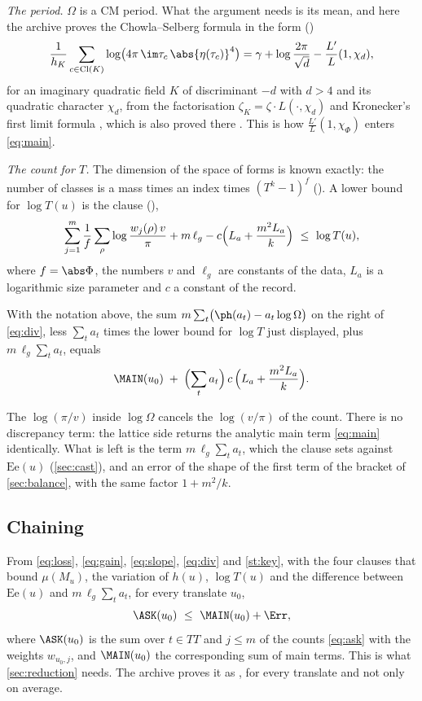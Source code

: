 \emph{The period.} $\Omega$ is a CM period. What the argument needs is its mean, and here the
archive proves the Chowla--Selberg formula
\cite{chowla1949epstein,selbergchowla1967} in the form \lvS{} ()
\begin{equation}\label{eq:cs}
\frac1{h_K}\sum_{c\in\mathrm{Cl}(K)}\log\bigl(4\pi\,\im\tau_c\,\abs{\eta(\tau_c)}^4\bigr)
=\gamma+\log\frac{2\pi}{\sqrt d}-\frac{L'}{L}(1,\chi_d),
\end{equation}
for an imaginary quadratic field $K$ of discriminant $-d$ with $d>4$ and its quadratic character
$\chi_d$, from the factorisation $\zeta_K=\zeta\cdot L(\cdot,\chi_d)$ and
Kronecker's first limit formula \cite{siegel1980advanced}, which is also proved there \lvS. This is how
$\tfrac{L'}{L}(1,\chi_\Phi)$ enters \eqref{eq:main}.

\emph{The count for $T$.} The dimension of the space of forms is known exactly: the number of
classes is a mass times an index times $(T^k-1)^f$ \lvS{} (\textsubscript{}). A
lower bound for $\log T(u)$ is the clause \lvS{}
(),
\[
\sum_{j=1}^m\frac1f\sum_{\rho}\log\frac{w_j(\rho)\,v}{\pi}+m\,\ell_g-c\Bigl(L_a+\frac{m^2L_a}{k}\Bigr)\ \le\ \log T(u),
\]
where $f=\abs\Phi$, the numbers $v$ and $\ell_g$ are constants of the data, $L_a$ is a
logarithmic size parameter and $c$ a constant of the record.

\begin{statement}\label{st:key}
With the notation above, the sum $m\sum_t\bigl(\ph(a_t)-a_t\log\Omega\bigr)$ on the right of
\eqref{eq:div}, less $\sum_ta_t$ times the lower bound for $\log T$ just displayed, plus
$m\,\ell_g\sum_ta_t$, equals
\[
\MAIN(u_0)\;+\;\Bigl(\sum_ta_t\Bigr)\,c\,\Bigl(L_a+\frac{m^2L_a}{k}\Bigr).
\]
\end{statement}
The $\log(\pi/v)$ inside $\log\Omega$ cancels the $\log(v/\pi)$ of the count. There is no
discrepancy term: the lattice side returns the analytic main term \eqref{eq:main} identically.
What is left is the term $m\,\ell_g\sum_ta_t$, which the clause  sets against
$\mathrm{Ee}(u)$ (\cref{sec:cast}), and an error of the shape of the first term of the bracket
of \cref{sec:balance}, with the same factor $1+m^2/k$.

\subsection{Chaining}
From \eqref{eq:loss}, \eqref{eq:gain}, \eqref{eq:slope}, \eqref{eq:div} and \cref{st:key},
with the four clauses that bound $\mu(M_u)$, the variation of $h(u)$, $\log T(u)$ and the
difference between $\mathrm{Ee}(u)$ and $m\,\ell_g\sum_ta_t$, for every translate $u_0$,
\[
\ASK(u_0)\ \le\ \MAIN(u_0)+\Err ,
\]
where $\ASK(u_0)$ is the sum over $t\in TT$ and $j\le m$ of the counts \eqref{eq:ask} with the
weights $w_{u_0,j}$, and $\MAIN(u_0)$ the corresponding sum of main terms. This is what
\cref{sec:reduction} needs. The archive proves it as
 \lvM, for every translate and not only on average.

